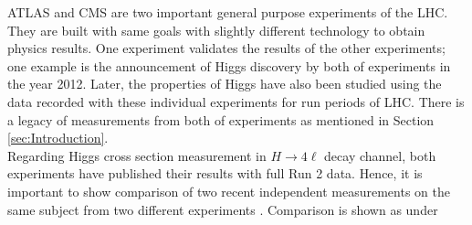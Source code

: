 ATLAS and CMS are two important general purpose experiments of the LHC. 
They are built with same goals with slightly different technology to obtain physics results.
One experiment validates the results of the other experiments; one example is the announcement of Higgs discovery by both of experiments in the year 2012.
Later, the properties of Higgs have also been  studied using the data recorded with these individual experiments for run periods of LHC.
There is a legacy of measurements from both of experiments as mentioned in Section \ref{sec:Introduction}.\\

Regarding Higgs cross section measurement in $H \rightarrow 4\ell$ decay channel, both experiments have published their results with full Run 2 data.
Hence, it is important to show comparison of two recent independent measurements on the same subject from two different experiments \cite{CMS:2019chr, ATLAS:2020wny}. 
Comparison is shown as under %
